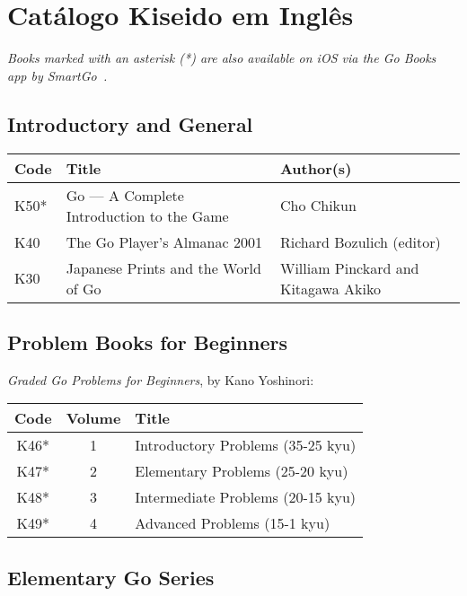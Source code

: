 \chapter{Catálogo Kiseido em Inglês}\label{ap:en}

\emph{Books marked with an asterisk (*) are also available on iOS via the Go Books~\cite{gobooks} app by SmartGo~\cite{smartgo}.}

\section{Introductory and General}

\begin{longtable}{l|p{45mm}|p{45mm}} 
    \hline
    \textbf{Code} & \textbf{Title} & \textbf{Author(s)} \\
    \hline \hline
    K50* & Go --- A Complete Introduction to the Game & Cho Chikun \\
    \hline
    K40 & The Go Player's Almanac 2001 & Richard Bozulich (editor) \\
    \hline
    K30 & Japanese Prints and the World of Go & William Pinckard and Kitagawa Akiko \\
    \hline
\end{longtable}


\section{Problem Books for Beginners}

\emph{Graded Go Problems for Beginners}, by Kano Yoshinori:

\begin{longtable}{c|c|l} 
    \hline
    \textbf{Code} & \textbf{Volume} & \textbf{Title} \\
    \hline \hline
    K46* & 1 & Introductory Problems (35-25 kyu) \\
    \hline
    K47* & 2 & Elementary Problems (25-20 kyu) \\
    \hline
    K48* & 3 & Intermediate Problems (20-15 kyu) \\
    \hline
    K49* & 4 & Advanced Problems (15-1 kyu) \\
    \hline
\end{longtable}

\section{Elementary Go Series}

